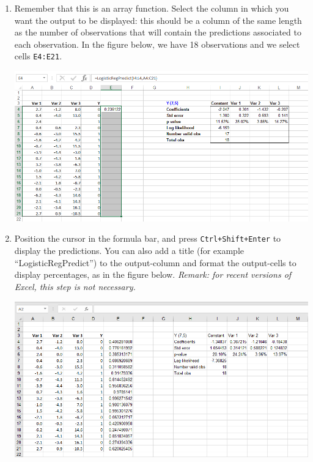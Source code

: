 \documentclass[12pt]{article}
\begin{document}
\begin{enumerate}
\medskip

\item Remember that this is an array function. Select the column in which you want the output to be displayed: this should be a column of the same length as the number of observations that will contain the predictions associated to each observation. In the figure below, we have 18 observations and we select cells \texttt{E4:E21}.

\medskip

\centerline{\includegraphics[width=6in]{figures/logpred3New}}

\medskip

\item Position the cursor in the formula bar, and press \texttt{Ctrl+Shift+Enter} to display the predictions. You can also add a title (for example ``LogisticRegPredict'') to the output-column and format the output-cells to display percentages, as in the figure below. \textit{Remark: for recent versions of Excel, this step is not necessary.}

\medskip

\centerline{\includegraphics[width=6in]{figures/LogRegPred4}}

\end{enumerate}
\end{document}
